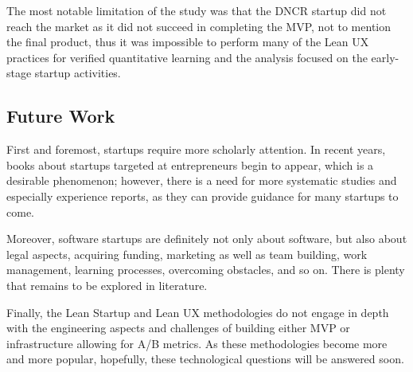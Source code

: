 \documentclass{article}
\begin{document}
The most notable limitation of the study was that the DNCR startup did not reach the market as it did not succeed in completing the MVP, not to mention the final product, thus it was impossible to perform many of the Lean UX practices for verified quantitative learning and the analysis focused on the early-stage startup activities.

\subsection{Future Work}

First and foremost, startups require more scholarly attention. In recent years, books about startups targeted at entrepreneurs begin to appear, which is a desirable phenomenon; however, there is a need for more systematic studies and especially experience reports, as they can provide guidance for many startups to come.

Moreover, software startups are definitely not only about software, but also about legal aspects, acquiring funding, marketing as well as team building, work management, learning processes, overcoming obstacles, and so on. There is plenty that remains to be explored in literature.

Finally, the Lean Startup and Lean UX methodologies do not engage in depth with the engineering aspects and challenges of building either MVP or infrastructure allowing for A/B metrics. As these methodologies become more and more popular, hopefully, these technological questions will be answered soon.

\listoffigures
 
\end{document}
